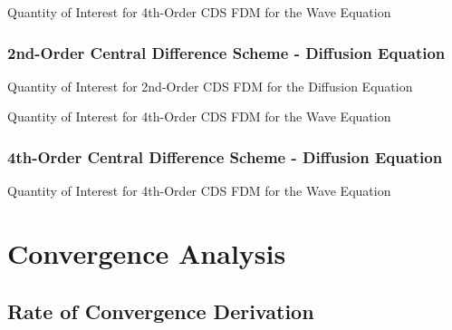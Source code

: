 \documentclass[10pt]{article}		%
\numberwithin{equation}{section}
\begin{document}
\begin{table}[H]
	\caption{Quantity of Interest for 4th-Order CDS FDM for the Wave Equation}		
	
\end{table}

\newpage

\subsubsection{2nd-Order Central Difference Scheme - Diffusion Equation}

\begin{table}[H]
	\flushleft
	\caption{Quantity of Interest for 2nd-Order CDS FDM for the Diffusion Equation}		
	
\end{table}

\begin{table}[H]
	\caption{Quantity of Interest for 4th-Order CDS FDM for the Wave Equation}		
	
\end{table}

\subsubsection{4th-Order Central Difference Scheme - Diffusion Equation}

\begin{table}[H]
	\caption{Quantity of Interest for 4th-Order CDS FDM for the Wave Equation}		
	
\end{table}

\newpage

\section{Convergence Analysis}

\subsection{Rate of Convergence Derivation}
\end{document}

